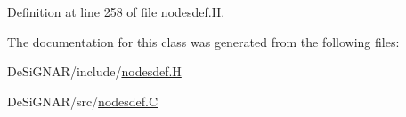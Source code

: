 Definition at line 258 of file nodesdef.\+H.



The documentation for this class was generated from the following files\+:\begin{DoxyCompactItemize}
\item 
De\+Si\+G\+N\+A\+R/include/\hyperlink{nodesdef_8_h}{nodesdef.\+H}\item 
De\+Si\+G\+N\+A\+R/src/\hyperlink{nodesdef_8_c}{nodesdef.\+C}\end{DoxyCompactItemize}
